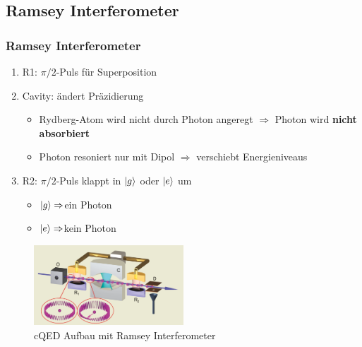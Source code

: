 \documentclass{beamer}
\begin{document}
\subsection{Ramsey Interferometer}
\begin{frame}
	\frametitle{Ramsey Interferometer}
	\begin{enumerate}
		\item R1: $\pi/2$-Puls für Superposition
		\item Cavity: ändert Präzidierung
		      \begin{itemize}
			      \item Rydberg-Atom wird nicht durch Photon angeregt $\Rightarrow$ Photon wird \textbf{nicht absorbiert}
			      \item Photon resoniert nur mit Dipol $\Rightarrow$ verschiebt Energieniveaus
		      \end{itemize}
		\item R2: $\pi/2$-Puls klappt in $\ket{g}$ oder $\ket{e}$ um
		      \begin{itemize}
			      \item $\ket{g}\Rightarrow$ein Photon
			      \item $\ket{e}\Rightarrow$kein Photon
		      \end{itemize}
	\end{enumerate}
	\begin{figure}
		\center\includegraphics[width=0.5\textwidth]{images/aufbau.png}
		\caption{cQED Aufbau mit Ramsey Interferometer\cite{lect}}
	\end{figure}
\end{frame}
\end{document}
